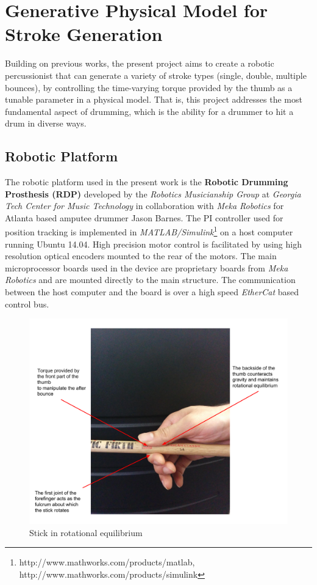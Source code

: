 \documentclass[final,1p,times]{elsarticle}
\begin{document}
\section{Generative Physical Model for Stroke Generation}
Building on previous works, the present project aims to create a robotic
percussionist that can generate a variety of stroke types (single, double, multiple bounces), by controlling the time-varying torque provided by the thumb as a tunable parameter in a physical model. That is, this project addresses the most fundamental aspect of drumming, which is the ability for a drummer to hit a drum in diverse ways.
\subsection{Robotic Platform}

The robotic platform used in the present work is the \textbf{Robotic Drumming Prosthesis (RDP)} developed by the \textit{Robotics Musicianship Group} at \textit{Georgia Tech Center for Music Technology} in collaboration with \textit{Meka Robotics} for Atlanta based amputee drummer Jason Barnes. The PI controller used for position tracking is implemented in \textit{MATLAB/Simulink}\footnote{http://www.mathworks.com/products/matlab, http://www.mathworks.com/products/simulink} on a host computer running Ubuntu 14.04. High precision motor control is facilitated by using high resolution optical encoders mounted to the rear of the motors. The main microprocessor boards used in the device are proprietary boards from \textit{Meka Robotics} and are mounted directly to the main structure. The communication between the host computer and the board is over a high speed \textit{EtherCat} based control bus. 
\begin{figure}[h]
	\begin{center}
		\includegraphics[width = 1\hsize]{./figures/Fig1.pdf}
		\caption{Stick in rotational equilibrium}
		\label{HS}
	\end{center}
\end{figure}
\end{document}
